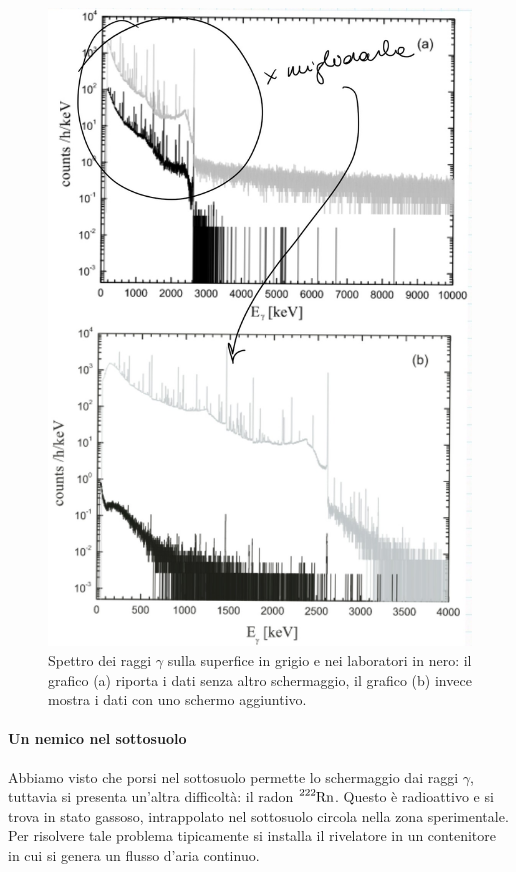 \begin{figure}[!h]
	\centering
	\includegraphics[scale=0.3]{Immagini/0414_background.png}
	\caption{Spettro dei raggi $\gamma$ sulla superfice in grigio e nei laboratori in nero: il grafico (a) riporta i dati senza altro schermaggio, il grafico (b) invece mostra i dati con uno schermo aggiuntivo.}
	\label{0414_bckgamma}
\end{figure}

\paragraph{Un nemico nel sottosuolo} 
Abbiamo visto che porsi nel sottosuolo permette lo schermaggio dai raggi $\gamma$, tuttavia si presenta un'altra difficoltà: il radon $\ce{^{222}Rn}$. Questo è radioattivo e si trova in stato gassoso, intrappolato nel sottosuolo circola nella zona sperimentale. Per risolvere tale problema tipicamente si installa il rivelatore in un contenitore in cui si genera un flusso d'aria continuo.